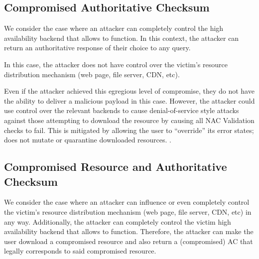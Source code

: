 \subsection{Compromised Authoritative Checksum}

We consider the case where an attacker can completely control the high
availability backend that allows \SYSTEM{} to function. In this context, the
attacker can return an authoritative response of their choice to any query.

In this case, the attacker does not have control over the victim's resource
distribution mechanism (web page, file server, CDN, etc).

Even if the attacker achieved this egregious level of compromise, they do not
have the ability to deliver a malicious payload in this case. However, the
attacker could use control over the relevant backends to cause denial-of-service
style attacks against those attempting to download the resource by causing all
NAC Validation checks to fail. This is mitigated by \SYSTEM{} allowing the user
to ``override'' its error states; \ie \SYSTEM{} does not mutate or quarantine
downloaded resources. .

\subsection{Compromised Resource and Authoritative Checksum}

We consider the case where an attacker can influence or even completely control
the victim's resource distribution mechanism (web page, file server, CDN, etc)
in any way. Additionally, the attacker can completely control the victim high
availability backend that allows \SYSTEM{} to function. Therefore, the attacker can
make the user download a compromised resource and also return a (compromised) AC
that legally corresponds to said compromised resource.
